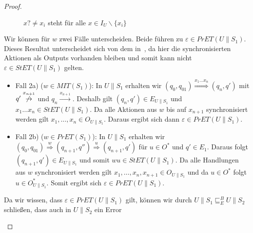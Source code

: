 \begin{proof}
\begin{itemize}
\begin{figure} [h!tbp]
\begin{center}
        \caption{$x?\neq x_i$ steht für alle $x\in I_U\backslash\{x_i\}$}
        \label{UohneE}
      \end{center}
      \end{figure}
      Wir können für $w$ zwei Fälle unterscheiden. Beide führen zu
      $\varepsilon\in PrET(U\|S_1)$. Dieses Resultat unterscheidet sich von dem
      in~\cite{Vogler2014EIO}, da hier die synchronisierten Aktionen als Outputs
      vorhanden bleiben und somit kann nicht $\varepsilon\in StET(U\|S_1)$
      gelten.
      \begin{itemize}
        \item Fall 2a) ($w\in MIT(S_1)$): In $U\|S_1$ erhalten wir
          $(q_0,q_{01}) \overset{x_1\dots x_n}{\Rightarrow} (q_n,q')$ mit
          $q' \overset{x_{n+1}}{\not{\hspace{-0.1cm}\rightarrow}}$ und $q_n
          \overset{x_{n+1}}{\rightarrow}$. Deshalb gilt $(q_n,q')\in
          E_{U\|S_1}$ und $x_1\dots x_n\in StET(U\|S_1)$. Da alle Aktionen aus
          $w$ bis auf $x_{n+1}$ synchronisiert werden gilt $x_1,\dots ,x_n\in
          O_{U\|S_1}$. Daraus ergibt sich dann $\varepsilon\in PrET(U\|S_1)$.
        \item Fall 2b) ($w\in PrET(S_1)$): In $U\|S_1$ erhalten wir
          $(q_0,q_{01}) \overset{w}{\Rightarrow} (q_{n+1},q'')
          \overset{u}{\Rightarrow} (q_{n+1},q')$ für $u\in O^*$ und $q'\in
          E_1$. Daraus folgt $(q_{n+1},q')\in E_{U\|S_1}$ und somit $wu\in
          StET(U\|S_1)$. Da alle Handlungen aus $w$ synchronisiert werden gilt
          $x_1,\dots ,x_n,x_{n+1}\in O_{U\|S_1}$ und da $u\in O^*$ folgt
          $u\in O_{U\|S_1}^*$. Somit ergibt sich $\varepsilon\in
          PrET(U\|S_1)$.
      \end{itemize}
      Da wir wissen, dass $\varepsilon\in PrET(U\|S_1)$ gilt, können wir durch
      $U\|S_1\sqsubseteq _E^B U\|S_2$ schließen, dass auch in $U\|S_2$ ein Error

\end{itemize}
\end{proof}

